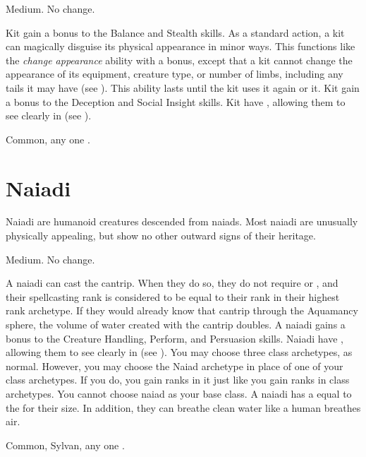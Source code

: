      Medium.
     No change.
    \begin{itemize}
         Kit gain a  bonus to the Balance and Stealth skills.
         As a standard action, a kit can magically disguise its physical appearance in minor ways.
            This functions like the \textit{change appearance} ability with a  bonus, except that a kit cannot change the appearance of its equipment, creature type, or number of limbs, including any tails it may have (see ).
            This ability lasts until the kit uses it again or  it.
         Kit gain a  bonus to the Deception and Social Insight skills.
         Kit have , allowing them to see clearly in  (see ).
    \end{itemize}
     Common, any one .

\section{Naiadi}
    Naiadi are humanoid creatures descended from naiads.
    Most naiadi are unusually physically appealing, but show no other outward signs of their heritage.

     Medium.
     No change.
    \begin{itemize}
         A naiadi can cast the  cantrip.
            When they do so, they do not require  or , and their spellcasting rank is considered to be equal to their rank in their highest rank archetype.
            If they would already know that cantrip through the Aquamancy sphere, the volume of water created with the cantrip doubles.
         A naiadi gains a  bonus to the Creature Handling, Perform, and Persuasion skills.
         Naiadi have , allowing them to see clearly in  (see ).
         You may choose three class archetypes, as normal.
            However, you may choose the Naiad archetype in place of one of your class archetypes.
            If you do, you gain ranks in it just like you gain ranks in class archetypes.
            You cannot choose naiad as your base class.
         A naiadi has a  equal to the  for their size.
            In addition, they can breathe clean water like a human breathes air.
    \end{itemize}
     Common, Sylvan, any one .

